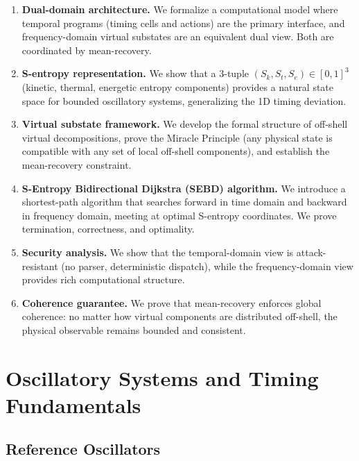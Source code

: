 \documentclass[twocolumn,11pt,a4paper]{article}
\newcommand{\Sk}{S_k}
\newcommand{\St}{S_t}
\newcommand{\Se}{S_e}
\begin{document}
\begin{enumerate}[leftmargin=1.5em,topsep=2pt,itemsep=1pt]
  \item \textbf{Dual-domain architecture.} We formalize a computational model where temporal programs (timing cells and actions) are the primary interface, and frequency-domain virtual substates are an equivalent dual view. Both are coordinated by mean-recovery.

  \item \textbf{S-entropy representation.} We show that a 3-tuple $(\Sk, \St, \Se) \in [0,1]^3$ (kinetic, thermal, energetic entropy components) provides a natural state space for bounded oscillatory systems, generalizing the 1D timing deviation.

  \item \textbf{Virtual substate framework.} We develop the formal structure of off-shell virtual decompositions, prove the Miracle Principle (any physical state is compatible with any set of local off-shell components), and establish the mean-recovery constraint.

  \item \textbf{S-Entropy Bidirectional Dijkstra (SEBD) algorithm.} We introduce a shortest-path algorithm that searches forward in time domain and backward in frequency domain, meeting at optimal S-entropy coordinates. We prove termination, correctness, and optimality.

  \item \textbf{Security analysis.} We show that the temporal-domain view is attack-resistant (no parser, deterministic dispatch), while the frequency-domain view provides rich computational structure.

  \item \textbf{Coherence guarantee.} We prove that mean-recovery enforces global coherence: no matter how virtual components are distributed off-shell, the physical observable remains bounded and consistent.
\end{enumerate}

\section{Oscillatory Systems and Timing Fundamentals}
\label{sec:oscillator}

\subsection{Reference Oscillators}
\end{document}

